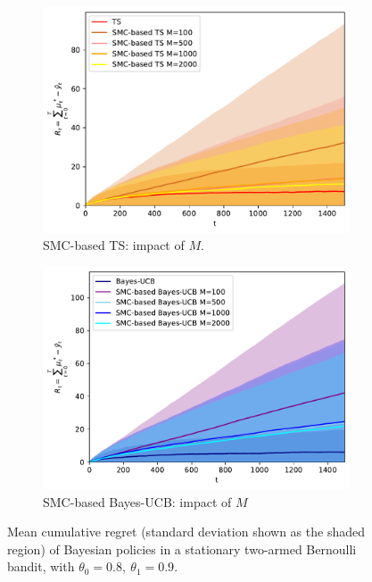 \begin{figure}[!h]
	\begin{subfigure}[b]{0.46\textwidth}
		\centering
		\includegraphics[width=\textwidth]{./fods_figs/static/bernoulli/A2/theta0.8_0.9_allM_cumulative_regret_ts}
		\caption{SMC-based TS: impact of $M$.}
	\end{subfigure}
	\begin{subfigure}[b]{0.46\textwidth}
		\centering
		\includegraphics[width=\textwidth]{./fods_figs/static/bernoulli/A2/theta0.8_0.9_allM_cumulative_regret_bucb}
		\caption{SMC-based Bayes-UCB: impact of $M$}
	\end{subfigure}
	
	\caption{Mean cumulative regret (standard deviation shown as the shaded region) of Bayesian policies in a stationary two-armed Bernoulli bandit, with $\theta_0=0.8, \ \theta_1=0.9$.}
\end{figure}

